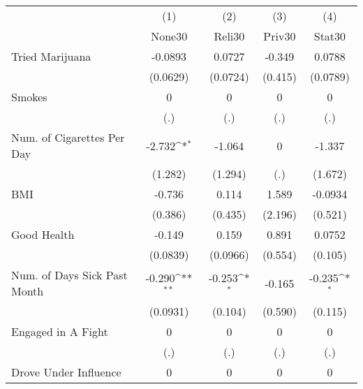 {
\def\sym#1{\ifmmode^{#1}\else\(^{#1}\)\fi}
\begin{tabular}{l*{4}{c}}
\hline\hline
            &\multicolumn{1}{c}{(1)}&\multicolumn{1}{c}{(2)}&\multicolumn{1}{c}{(3)}&\multicolumn{1}{c}{(4)}\\
            &\multicolumn{1}{c}{None30}&\multicolumn{1}{c}{Reli30}&\multicolumn{1}{c}{Priv30}&\multicolumn{1}{c}{Stat30}\\
\hline
Tried Marijuana&     -0.0893         &      0.0727         &      -0.349         &      0.0788         \\
            &    (0.0629)         &    (0.0724)         &     (0.415)         &    (0.0789)         \\
[1em]
Smokes      &           0         &           0         &           0         &           0         \\
            &         (.)         &         (.)         &         (.)         &         (.)         \\
[1em]
Num. of Cigarettes Per Day&      -2.732\sym{*}  &      -1.064         &           0         &      -1.337         \\
            &     (1.282)         &     (1.294)         &         (.)         &     (1.672)         \\
[1em]
BMI         &      -0.736         &       0.114         &       1.589         &     -0.0934         \\
            &     (0.386)         &     (0.435)         &     (2.196)         &     (0.521)         \\
[1em]
Good Health &      -0.149         &       0.159         &       0.891         &      0.0752         \\
            &    (0.0839)         &    (0.0966)         &     (0.554)         &     (0.105)         \\
[1em]
Num. of Days Sick Past Month&      -0.290\sym{**} &      -0.253\sym{*}  &      -0.165         &      -0.235\sym{*}  \\
            &    (0.0931)         &     (0.104)         &     (0.590)         &     (0.115)         \\
[1em]
Engaged in A Fight&           0         &           0         &           0         &           0         \\
            &         (.)         &         (.)         &         (.)         &         (.)         \\
[1em]
Drove Under Influence&           0         &           0         &           0         &           0         \\

\end{tabular}}
